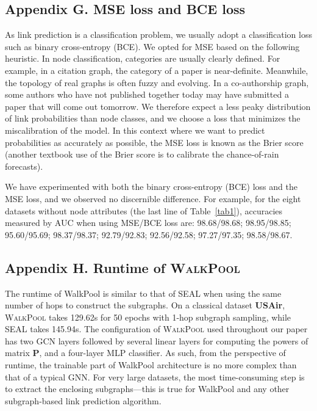 \documentclass[11pt]{article}
\newcommand{\walkpool}{\textsc{WalkPool}\xspace}
\begin{document}
\subsection*{Appendix G. MSE loss and BCE loss}
As link prediction is a classification problem, we usually adopt a classification loss such as binary cross-entropy (BCE).
We opted for MSE based on the following heuristic. In node classification, categories are usually clearly defined. For example, in a citation graph, the category of a paper is near-definite. Meanwhile, the topology of real graphs is often fuzzy and evolving. In a co-authorship graph, some authors who have not published together today may have submitted a paper that will come out tomorrow. We therefore expect a less peaky distribution of link probabilities than node classes, and we choose a loss that minimizes the miscalibration of the model. In this context where we want to predict probabilities as accurately as possible, the MSE loss is known as the Brier score (another textbook use of the Brier score is to calibrate the chance-of-rain forecasts).

We have experimented with both the binary cross-entropy (BCE) loss and the MSE loss, and we observed no discernible difference. For example, for the eight datasets without node attributes (the last line of Table~\ref{tab1}), accuracies measured by AUC when using MSE/BCE loss are:  98.68/98.68;  98.95/98.85; 95.60/95.69; 98.37/98.37; 92.79/92.83; 92.56/92.58; 97.27/97.35; 98.58/98.67. 

\subsection*{Appendix H. Runtime of \walkpool}
The runtime of WalkPool is similar to that of SEAL when using the same number of hops to construct the subgraphs. On a classical dataset \textbf{USAir}, \walkpool takes 129.62s for 50 epochs with 1-hop subgraph sampling, while SEAL takes 145.94s. The configuration of \walkpool used throughout our paper has two GCN layers followed by several linear layers for computing the powers of matrix $\mathbf{P}$, and a four-layer MLP classifier. As such, from the perspective of runtime, the trainable part of WalkPool architecture is no more complex than that of a typical GNN. For very large datasets, the most time-consuming step is to extract the enclosing subgraphs---this is true for WalkPool and any other subgraph-based link prediction algorithm.
\end{document}
